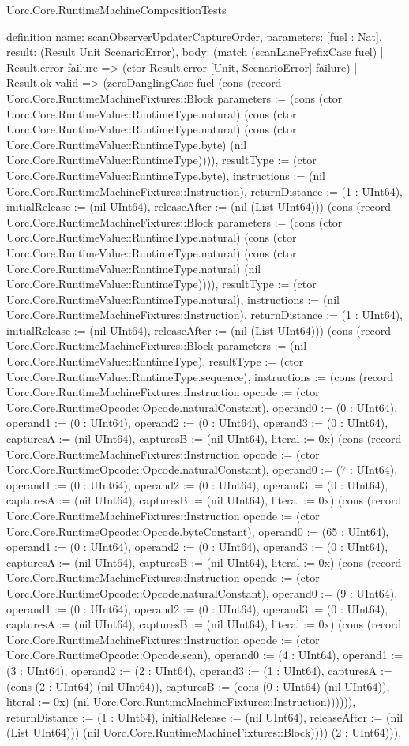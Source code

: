 \begin{lexlean}{Uorc.Core.RuntimeMachineCompositionTests}
\begin{semanticmodule}
definition{
  name: scanObserverUpdaterCaptureOrder,
  parameters: [fuel : Nat],
  result: (Result Unit ScenarioError),
  body: (match (scanLanePrefixCase fuel)
    | Result.error failure => (ctor Result.error [Unit, ScenarioError] failure)
    | Result.ok valid => (zeroDanglingCase fuel (cons (record Uorc.Core.RuntimeMachineFixtures::Block {parameters := (cons (ctor Uorc.Core.RuntimeValue::RuntimeType.natural) (cons (ctor Uorc.Core.RuntimeValue::RuntimeType.natural) (cons (ctor Uorc.Core.RuntimeValue::RuntimeType.byte) (nil Uorc.Core.RuntimeValue::RuntimeType)))), resultType := (ctor Uorc.Core.RuntimeValue::RuntimeType.byte), instructions := (nil Uorc.Core.RuntimeMachineFixtures::Instruction), returnDistance := (1 : UInt64), initialRelease := (nil UInt64), releaseAfter := (nil (List UInt64))}) (cons (record Uorc.Core.RuntimeMachineFixtures::Block {parameters := (cons (ctor Uorc.Core.RuntimeValue::RuntimeType.natural) (cons (ctor Uorc.Core.RuntimeValue::RuntimeType.natural) (cons (ctor Uorc.Core.RuntimeValue::RuntimeType.natural) (nil Uorc.Core.RuntimeValue::RuntimeType)))), resultType := (ctor Uorc.Core.RuntimeValue::RuntimeType.natural), instructions := (nil Uorc.Core.RuntimeMachineFixtures::Instruction), returnDistance := (1 : UInt64), initialRelease := (nil UInt64), releaseAfter := (nil (List UInt64))}) (cons (record Uorc.Core.RuntimeMachineFixtures::Block {parameters := (nil Uorc.Core.RuntimeValue::RuntimeType), resultType := (ctor Uorc.Core.RuntimeValue::RuntimeType.sequence), instructions := (cons (record Uorc.Core.RuntimeMachineFixtures::Instruction {opcode := (ctor Uorc.Core.RuntimeOpcode::Opcode.naturalConstant), operand0 := (0 : UInt64), operand1 := (0 : UInt64), operand2 := (0 : UInt64), operand3 := (0 : UInt64), capturesA := (nil UInt64), capturesB := (nil UInt64), literal := 0x}) (cons (record Uorc.Core.RuntimeMachineFixtures::Instruction {opcode := (ctor Uorc.Core.RuntimeOpcode::Opcode.naturalConstant), operand0 := (7 : UInt64), operand1 := (0 : UInt64), operand2 := (0 : UInt64), operand3 := (0 : UInt64), capturesA := (nil UInt64), capturesB := (nil UInt64), literal := 0x}) (cons (record Uorc.Core.RuntimeMachineFixtures::Instruction {opcode := (ctor Uorc.Core.RuntimeOpcode::Opcode.byteConstant), operand0 := (65 : UInt64), operand1 := (0 : UInt64), operand2 := (0 : UInt64), operand3 := (0 : UInt64), capturesA := (nil UInt64), capturesB := (nil UInt64), literal := 0x}) (cons (record Uorc.Core.RuntimeMachineFixtures::Instruction {opcode := (ctor Uorc.Core.RuntimeOpcode::Opcode.naturalConstant), operand0 := (9 : UInt64), operand1 := (0 : UInt64), operand2 := (0 : UInt64), operand3 := (0 : UInt64), capturesA := (nil UInt64), capturesB := (nil UInt64), literal := 0x}) (cons (record Uorc.Core.RuntimeMachineFixtures::Instruction {opcode := (ctor Uorc.Core.RuntimeOpcode::Opcode.scan), operand0 := (4 : UInt64), operand1 := (3 : UInt64), operand2 := (2 : UInt64), operand3 := (1 : UInt64), capturesA := (cons (2 : UInt64) (nil UInt64)), capturesB := (cons (0 : UInt64) (nil UInt64)), literal := 0x}) (nil Uorc.Core.RuntimeMachineFixtures::Instruction)))))), returnDistance := (1 : UInt64), initialRelease := (nil UInt64), releaseAfter := (nil (List UInt64))}) (nil Uorc.Core.RuntimeMachineFixtures::Block)))) (2 : UInt64))),
}
\end{semanticmodule}
\end{lexlean}
